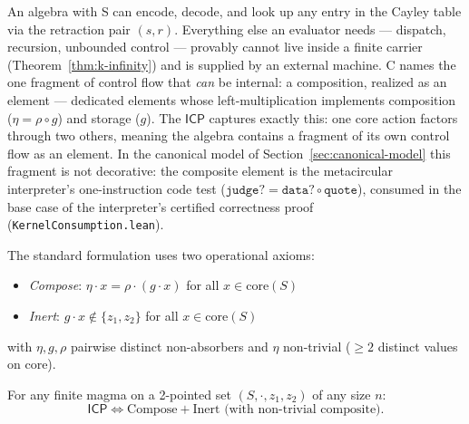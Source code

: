 \documentclass[sigconf,screen]{acmart}
\newcommand{\dotop}{\cdot}
\newcommand{\ICP}{\textsf{ICP}}
\newcommand{\core}{\mathrm{core}}
\theoremstyle{remark}
\begin{document}
An algebra with S can encode, decode, and look up any entry in the Cayley table via the retraction pair $(s, r)$. Everything else an evaluator needs --- dispatch, recursion, unbounded control --- provably cannot live inside a finite carrier (Theorem~\ref{thm:k-infinity}) and is supplied by an external machine. C names the one fragment of control flow that \emph{can} be internal: a composition, realized as an element --- dedicated elements whose left-multiplication implements composition ($\eta = \rho \circ g$) and storage ($g$). The $\ICP$ captures exactly this: one core action factors through two others, meaning the algebra contains a fragment of its own control flow as an element. In the canonical model of Section~\ref{sec:canonical-model} this fragment is not decorative: the composite element is the metacircular interpreter's one-instruction code test ($\texttt{judge?} = \texttt{data?} \circ \texttt{quote}$), consumed in the base case of the interpreter's certified correctness proof (\texttt{KernelConsumption.lean}).

The standard formulation uses two operational axioms:
\begin{itemize}
  \item \emph{Compose}: $\eta \dotop x = \rho \dotop (g \dotop x)$ for all $x \in \core(S)$
  \item \emph{Inert}: $g \dotop x \notin \{z_1, z_2\}$ for all $x \in \core(S)$
\end{itemize}
with $\eta, g, \rho$ pairwise distinct non-absorbers and $\eta$ non-trivial ($\geq 2$ distinct values on core).

\begin{theorem}[$\ICP$ Equivalence]
\label{thm:icp-equiv}
For any finite magma on a 2-pointed set $(S, \dotop, z_1, z_2)$ of any size $n$:
\[
\ICP \iff \text{Compose} + \text{Inert} \text{ (with non-trivial composite)}.
\]
\end{theorem}
\end{document}

